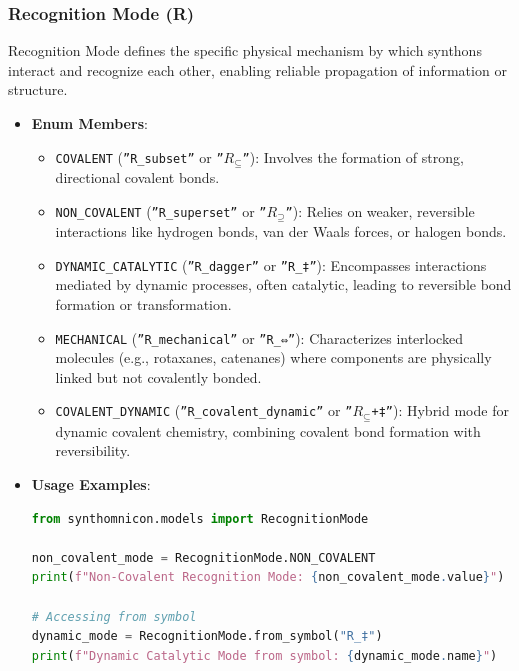 \documentclass[12pt,a4paper]{article}
\begin{document}
\subsubsection{Recognition Mode (R)}

Recognition Mode defines the specific physical mechanism by which synthons interact and recognize each other, enabling reliable propagation of information or structure.

\begin{itemize}
    \item 
    \textbf{Enum Members}:

    \begin{itemize}
    \item \texttt{COVALENT} (\texttt{''R\_subset''} or \texttt{''$R_{\subseteq}$''}): Involves the formation of strong, directional covalent bonds.
    \item \texttt{NON\_COVALENT} (\texttt{''R\_superset''} or \texttt{''$R_{\supseteq}$''}): Relies on weaker, reversible interactions like hydrogen bonds, van der Waals forces, or halogen bonds.
    \item \texttt{DYNAMIC\_CATALYTIC} (\texttt{''R\_dagger''} or \texttt{''R\_‡''}): Encompasses interactions mediated by dynamic processes, often catalytic, leading to reversible bond formation or transformation.
    \item \texttt{MECHANICAL} (\texttt{''R\_mechanical''} or \texttt{''R\_⇔''}): Characterizes interlocked molecules (e.g., rotaxanes, catenanes) where components are physically linked but not covalently bonded.
    \item \texttt{COVALENT\_DYNAMIC} (\texttt{''R\_covalent\_dynamic''} or \texttt{''$R_{\subseteq}$+‡''}): Hybrid mode for dynamic covalent chemistry, combining covalent bond formation with reversibility.
\end{itemize}

    \item 
    \textbf{Usage Examples}:

    \begin{lstlisting}[language=Python]
from synthomnicon.models import RecognitionMode

non_covalent_mode = RecognitionMode.NON_COVALENT
print(f"Non-Covalent Recognition Mode: {non_covalent_mode.value}")

# Accessing from symbol
dynamic_mode = RecognitionMode.from_symbol("R_‡")
print(f"Dynamic Catalytic Mode from symbol: {dynamic_mode.name}")
\end{lstlisting}


\end{itemize}
\end{document}
